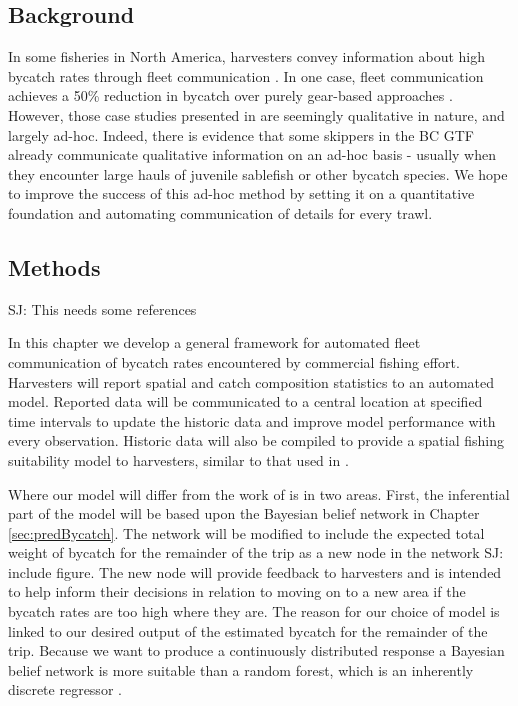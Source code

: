 \documentclass{article}
\newcommand{\sj}[1]{{\color{red}\mbox{}\marginpar{\raggedleft\hspace{0pt}*} SJ: #1}}
\begin{document}
\subsection{Background}
In some fisheries in North America, harvesters convey information about high bycatch rates through fleet communication \citep{gilman2006fleet,hall2005managing}. In one case, fleet communication achieves a 50\% reduction in bycatch over purely gear-based approaches \citep{gilman2006fleet}. However, those case studies presented in \citet{gilman2006fleet} are seemingly qualitative in nature, and largely ad-hoc. Indeed, there is evidence that some skippers in the BC GTF already communicate qualitative information on an ad-hoc basis - usually when they encounter large hauls of juvenile sablefish or other bycatch species. We hope to improve the success of this ad-hoc method by setting it on a quantitative foundation and automating communication of details for every trawl.

\subsection{Methods}

\sj{This needs some references}

In this chapter we develop a general framework for automated fleet communication of bycatch rates encountered by commercial fishing effort. Harvesters will report spatial and catch composition statistics to an automated model. Reported data will be communicated to a central location at specified time intervals to update the historic data and improve model performance with every observation. Historic data will also be compiled to provide a spatial fishing suitability model to harvesters, similar to that used in \cite{vilela2015fishing}.

Where our model will differ from the work of \citet{vilela2015fishing} is in two areas. First, the inferential part of the model will be based upon the Bayesian belief network in Chapter \ref{sec:predBycatch}. The network will be modified to include the expected total weight of bycatch for the remainder of the trip as a new node in the network \sj{include figure}. The new node will provide feedback to harvesters and is intended to help inform their decisions in relation to moving on to a new area if the bycatch rates are too high where they are. The reason for our choice of model is linked to our desired output of the estimated bycatch for the remainder of the trip. Because we want to produce a continuously distributed response a Bayesian belief network is more suitable than a random forest, which is an inherently discrete regressor \citep{breiman2001random}.
\end{document}

